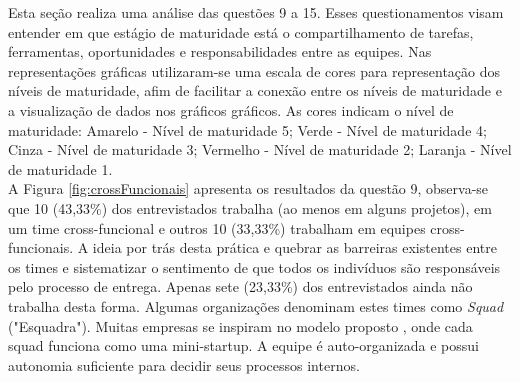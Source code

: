 \documentclass[twoside,english,brazilian]{UNISINOSartigo}
\begin{document}
Esta seção realiza uma análise das questões 9 a 15. Esses questionamentos visam entender em que estágio de maturidade está o compartilhamento de tarefas, ferramentas, oportunidades e responsabilidades entre as equipes. Nas representações gráficas utilizaram-se uma escala de cores para representação dos níveis de maturidade, afim de facilitar a conexão entre os níveis de maturidade e a visualização de dados nos gráficos gráficos. As cores indicam o nível de maturidade: Amarelo - Nível de maturidade 5; Verde - Nível de maturidade 4; Cinza - Nível de maturidade 3; Vermelho - Nível de maturidade 2; Laranja - Nível de maturidade 1.\\ \indent
 A Figura \ref{fig:crossFuncionais} apresenta os resultados da questão 9, observa-se que 10 (43,33\%) dos entrevistados trabalha (ao menos em alguns projetos), em um time cross-funcional e outros 10 (33,33\%) trabalham em equipes cross-funcionais. A ideia por trás desta prática e quebrar as barreiras existentes entre os times e sistematizar o sentimento de que todos os indivíduos são responsáveis pelo processo de entrega.
Apenas sete (23,33\%) dos entrevistados ainda não trabalha desta forma. 
Algumas organizações denominam estes times como \textit{Squad} ("Esquadra"). Muitas empresas se inspiram no modelo proposto , onde cada squad funciona como uma mini-startup. A equipe é auto-organizada e possui autonomia suficiente para decidir seus processos internos.
\end{document}
